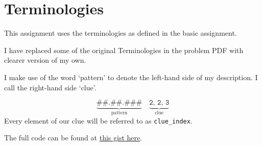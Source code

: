 \section*{Terminologies}
This assignment uses the terminologies as defined in the basic assignment. 

I have replaced some of the original Terminologies in the problem PDF with clearer version of my own.

I make use of the word `pattern' to denote the left-hand side of my description. I call the right-hand side `clue'.

\begin{equation*}
    \underbrace{\texttt{\#\#.\#\#.\#\#\#}}_\text{pattern} \quad \underbrace{\texttt{2, 2, 3}}_\text{clue}
\end{equation*}
Every element of our clue will be referred to as \texttt{clue\_index}.

\noindent The full code can be found at \href{https://gist.github.com/ohshitnotgood/3ebf130cf0dab51544ba0ace3cec93ae}{this gist here}.